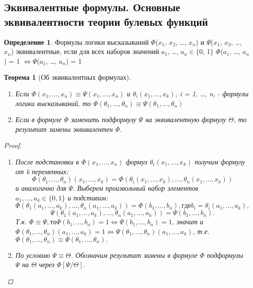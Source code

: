 \documentclass[a4paper]{article}
\newtheorem{theorem}{Теорема}[section]
\theoremstyle{definition}
\newtheorem*{definition}{Определение}
\theoremstyle{remark}
\begin{document}
    \subsection{Эквивалентные формулы. Основные эквивалентности теории булевых функций}
	\begin{definition}
		Формулы логики высказываний 	$\Phi$($x_1$, $x_2$, \dots , $x_n$) и $\Psi$($x_1$, $x_2$, \dots , $x_n$) эквивалентные, если для всех наборов значений $a_1$, \dots , $a_n\in\{$0, 1$\}$
		$\Phi$($a_1$, \dots , $a_n$) = 1 $\Leftrightarrow \Psi$($a_1$, \dots , $a_n$) = 1
	\end{definition}
    \begin{theorem}[Об эквивалентных формулах]


        \begin{enumerate}
           	\item Если $\Phi(x_1, \dots , x_n) \equiv \Psi(x_1, \dots , x_n)$ и $\theta_i(x_1, \dots , x_k)$, i = 1, \dots , n, - формулы логики высказываний, то $\Phi(\theta_1, \dots , \theta_n) \equiv \Psi(\theta_1, \dots , \theta_n)$
		\item Если в формуле $\Phi$ заменить подформулу $\Psi$ на эквивалентную формулу $\Theta$, то результат замены эквивалентен $\Phi.$
        \end{enumerate}
	\begin{proof}
		\begin{enumerate}
			\item После подстановки в $\Phi(x_1, \dots , x_n)$ формул $\theta_i(x_1, \dots , x_k)$ получим формулу от k переменных: $$\Phi(\theta_1, \dots , \theta_n)(x_1, \dots , x_k) = \Phi(\theta_i(x_1, \dots , x_k), \dots , \theta_n(x_1, \dots , x_k))$$ и аналогично для $\Psi.$ 
            Выберем произвольный набор элементов $a_1, \dots , a_k \in \{0, 1\}$ и подставим:
            $$\Phi(\theta_1(a_1, \dots , a_k), \dots , \theta_n(a_1, \dots , a_k)) = \Phi(b_1, \dots , b_n), где b_i = \theta_i(a_1, \dots , a_k),$$ 
            $$\Psi(\theta_1(a_1, \dots , a_k), \dots , \theta_n(a_1, \dots , a_k)) = \Psi(b_1, \dots , b_n).$$ 
            Т.к. $\Phi \equiv \Psi, то \Phi(b_1, \dots , b_n) = 1 \Leftrightarrow \Psi(b_1, \dots , b_n) = 1$, значит и 
            $\Phi(\theta_1, \dots , \theta_n)(a_1, \dots , a_k) = 1 \Leftrightarrow \Psi(\theta_1, \dots , \theta_n)(a_1, \dots , a_k)$, т.е. 
            $\Phi(\theta_1, \dots , \theta_n) \equiv \Psi(\theta_1, \dots , \theta_n).$
			\item По условию $\Psi \equiv \Theta$. Обозначим результат замены в формуле $\Phi$ подформулы $\Psi$ на $\Theta$ через $\Phi[\Psi/\Theta].$


\end{enumerate}
\end{proof}
\end{theorem}
\end{document}
